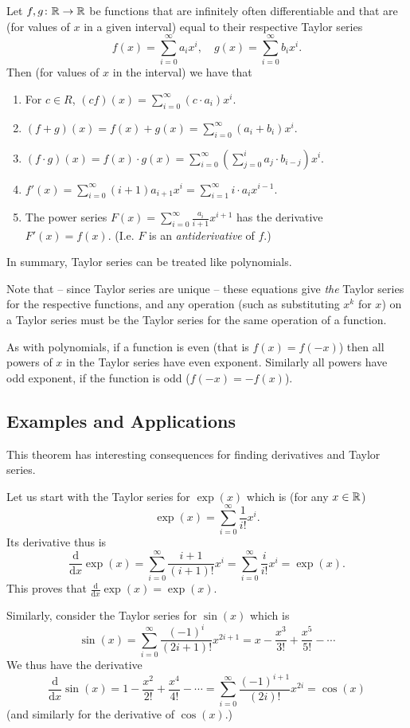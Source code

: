 \begin{thm}
Let $f,g\colon{\mathbb R} \to{\mathbb R}$ be functions that are infinitely often differentiable
and that are (for values of $x$ in a given interval) equal to their
respective Taylor series
\[
f(x)=\sum_{i=0}^\infty a_i x^i,\quad
g(x)=\sum_{i=0}^\infty b_i x^i.
\]
Then (for values of $x$ in the interval) we have that
\begin{enumerate}
\item For $c\in R$, $(cf)(x)=\sum_{i=0}^\infty (c\cdot a_i)x^i$.
\item $(f+g)(x)=f(x)+g(x)=\sum_{i=0}^\infty (a_i+b_i) x^i$.
\item $(f\cdot g)(x)=f(x)\cdot g(x)=\sum_{i=0}^\infty \left(\sum_{j=0}^i
a_j\cdot b_{i-j}\right) x^i$.
\item $f'(x)=\sum_{i=0}^\infty (i+1)a_{i+1}x^i
=\sum_{i=1}^\infty i\cdot a_i x^{i-1}$.
\item The power series $F(x)=\sum_{i=0}^\infty \frac{a_i}{i+1} x^{i+1}$ has
the derivative $F'(x)=f(x)$. (I.e. $F$ is an {\em antiderivative} of $f$.)
\end{enumerate}
In summary, Taylor series can be treated like polynomials.
\end{thm}
Note that -- since Taylor series are unique -- these equations give {\em the}
Taylor series for the respective functions, and any operation (such as
substituting $x^k$ for $x$) on a Taylor series must be the Taylor series for
the same operation of a function.
\medskip

As with polynomials, if a function is even (that is $f(x)=f(-x)$) then all
powers of $x$ in the Taylor series have even exponent. Similarly all
powers have odd exponent, if the function is odd ($f(-x)=-f(x)$).

\subsection{Examples and Applications}

This theorem has interesting consequences for finding derivatives and Taylor
series.

Let us start with the Taylor series for $\exp(x)$ which is (for any
$x\in{\mathbb R}$)
\[
\exp(x)=\sum_{i=0}^\infty \frac{1}{i!} x^i.
\]
Its derivative thus is
\[
\frac{\mbox{d}}{\mbox{d}x}
\exp(x)=\sum_{i=0}^\infty \frac{i+1}{(i+1)!} x^i
=\sum_{i=0}^\infty \frac{i}{i!} x^i=\exp(x).
\]
This proves that $\frac{\mbox{d}}{\mbox{d}x}\exp(x)=\exp(x)$.
\smallskip

Similarly, consider the Taylor series for $\sin(x)$ which is
\[
\sin(x)=\sum_{i=0}^\infty
\frac{(-1)^i}{(2i+1)!}x^{2i+1}=x-\frac{x^3}{3!}+\frac{x^5}{5!}-\cdots
\]
We thus have the derivative
\[
\frac{\mbox{d}}{\mbox{d}x}
\sin(x)=
1-\frac{x^2}{2!}+\frac{x^4}{4!}-\cdots
=\sum_{i=0}^\infty \frac{(-1)^{i+1}}{(2i)!}x^{2i}=\cos(x)
\]
(and similarly for the derivative of $\cos(x)$.)

